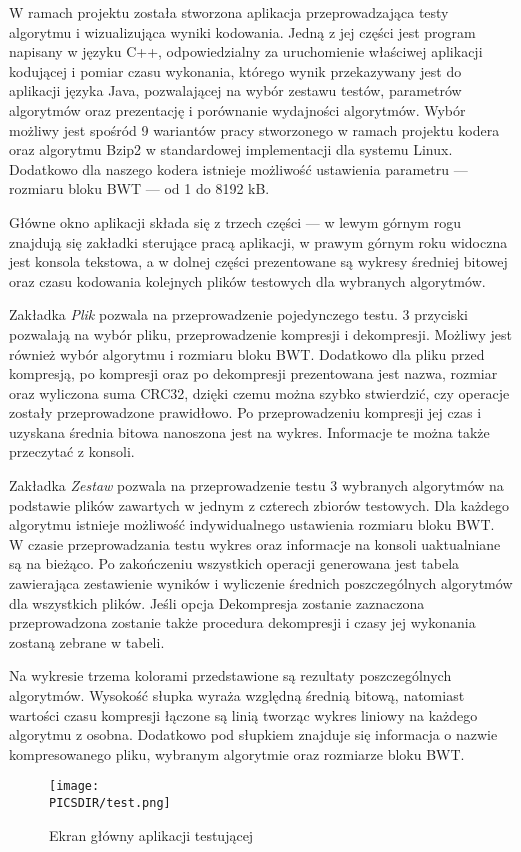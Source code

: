 
W ramach projektu została stworzona aplikacja przeprowadzająca testy
algorytmu i wizualizująca wyniki kodowania. Jedną z jej części jest
program napisany w języku C++, odpowiedzialny za uruchomienie
właściwej aplikacji kodującej i pomiar czasu wykonania, którego wynik
przekazywany jest do aplikacji języka Java, pozwalającej na wybór
zestawu testów, parametrów algorytmów oraz prezentację i porównanie
wydajności algorytmów. Wybór możliwy jest spośród 9 wariantów pracy
stworzonego w ramach projektu kodera oraz algorytmu Bzip2 w
standardowej implementacji dla systemu Linux. Dodatkowo dla naszego
kodera istnieje możliwość ustawienia parametru --- rozmiaru bloku BWT ---
od 1 do 8192 kB.

Główne okno aplikacji składa się z trzech części --- w lewym górnym
rogu znajdują się zakładki sterujące pracą aplikacji, w prawym górnym
roku widoczna jest konsola tekstowa, a w dolnej części prezentowane są
wykresy średniej bitowej oraz czasu kodowania kolejnych plików
testowych dla wybranych algorytmów.

Zakładka {\em Plik} pozwala na przeprowadzenie pojedynczego testu. 3
przyciski pozwalają na wybór pliku, przeprowadzenie kompresji i
dekompresji. Możliwy jest również wybór algorytmu i rozmiaru bloku
BWT. Dodatkowo dla pliku przed kompresją, po kompresji oraz po
dekompresji prezentowana jest nazwa, rozmiar oraz wyliczona suma
CRC32, dzięki czemu można szybko stwierdzić, czy operacje zostały
przeprowadzone prawidłowo. Po przeprowadzeniu kompresji jej czas i
uzyskana średnia bitowa nanoszona jest na wykres. Informacje te można
także przeczytać z konsoli.

Zakładka {\em Zestaw} pozwala na przeprowadzenie testu 3 wybranych
algorytmów na podstawie plików zawartych w jednym z czterech zbiorów
testowych. Dla każdego algorytmu istnieje możliwość indywidualnego
ustawienia rozmiaru bloku BWT. W czasie przeprowadzania testu wykres
oraz informacje na konsoli uaktualniane są na bieżąco. Po zakończeniu
wszystkich operacji generowana jest tabela zawierająca zestawienie
wyników i wyliczenie średnich poszczególnych algorytmów dla wszystkich
plików. Jeśli opcja Dekompresja zostanie zaznaczona przeprowadzona
zostanie także procedura dekompresji i czasy jej wykonania zostaną
zebrane w tabeli.

Na wykresie trzema kolorami przedstawione są rezultaty poszczególnych
algorytmów. Wysokość słupka wyraża względną średnią bitową, natomiast
wartości czasu kompresji łączone są linią tworząc wykres liniowy na
każdego algorytmu z osobna. Dodatkowo pod słupkiem znajduje się
informacja o nazwie kompresowanego pliku, wybranym algorytmie oraz
rozmiarze bloku BWT.

\begin{figure}[htb]
\texttt{[image: \\PICSDIR/test.png]}
\caption{\label{fig:aplikacja_testujaca}Ekran główny aplikacji testującej}
\end{figure}